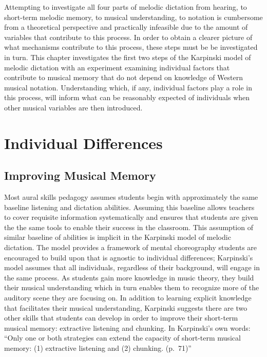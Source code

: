 \documentclass[12pt,]{book}
\begin{document}
Attempting to investigate all four parts of melodic dictation from hearing, to short-term melodic memory, to musical understanding, to notation is cumbersome from a theoretical perspective and practically infeasible due to the amount of variables that contribute to this process.
In order to obtain a clearer picture of what mechanisms contribute to this process, these steps must be be investigated in turn.
This chapter investigates the first two steps of the Karpinski model of melodic dictation \citep{karpinskiAuralSkillsAcquisition2000, karpinskiModelMusicPerception1990} with an experiment examining individual factors that contribute to musical memory that do not depend on knowledge of Western musical notation.
Understanding which, if any, individual factors play a role in this process, will inform what can be reasonably expected of individuals when other musical variables are then introduced.

\hypertarget{individual-differences-1}{%
\section{Individual Differences}\label{individual-differences-1}}

\hypertarget{improving-musical-memory}{%
\subsection{Improving Musical Memory}\label{improving-musical-memory}}

Most aural skills pedagogy assumes students begin with approximately the same baseline listening and dictation abilities.
Assuming this baseline allows teachers to cover requisite information systematically and ensures that students are given the the same tools to enable their success in the classroom.
This assumption of similar baseline of abilities is implicit in the Karpinski model of melodic dictation.
The model provides a framework of mental choreography students are encouraged to build upon that is agnostic to individual differences; Karpinski's model assumes that all individuals, regardless of their background, will engage in the same process.
As students gain more knowledge in music theory, they build their musical understanding which in turn enables them to recognize more of the auditory scene they are focusing on.
In addition to learning explicit knowledge that facilitates their musical understanding, Karpinski suggests there are two other skills that students can develop in order to improve their short-term musical memory: extractive listening and chunking.
In Karpinski's own words: ``Only one or both strategies can extend the capacity of short-term musical memory: (1) extractive listening and (2) chunking. (p.~71)''
\end{document}
